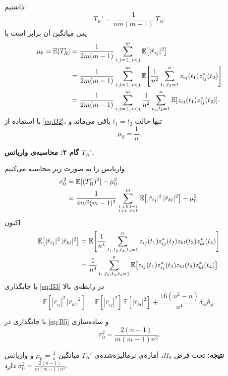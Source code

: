 \begin{اثبات}
	داشتیم‌:
	\[
	T_{R}'=\frac{1}{nm(m-1)}\,T_{R}.
	\]
	پس میانگین آن برابر است با
	\begin{align}
		\mu_{0}=\mathbb{E}[T_{R}']
		&=\frac{1}{2m(m-1)}\sum_{i,j=1,\; i<j}^{m}\mathbb{E}\!\left[|\hat r_{ij}|^{2}\right] \notag \\
		&=\frac{1}{2m(m-1)}\sum_{i,j=1,\; i<j}^{m}
		\mathbb{E}\!\left[\frac{1}{n^{2}}\sum_{t_{1},t_{2}=1}^{n}z_{ij}(t_{1})z_{ij}^{*}(t_{2})\right] \notag \\
		&=\frac{1}{2m(m-1)}\sum_{i,j=1,\; i<j}^{m}\frac{1}{n^{2}}\sum_{t_{1},t_{2}=1}^{n}\mathbb{E}[z_{ij}(t_{1})z_{ij}^{*}(t_{2})]. \label{eq:B4}
	\end{align}
	با استفاده از \eqref{eq:B2}، تنها حالت $t_{1}=t_{2}$ باقی می‌ماند و
	\[
	\mu_{0}=\frac{1}{n}.
	\]
	
	\medskip
	\noindent\textbf{گام ۲: محاسبه‌ی واریانس $T_{R}'$.}
	
	واریانس را به صورت زیر محاسبه می‌کنیم
	\begin{align}
		\sigma_{0}^{2}&=\mathbb{E}[(T_{R}')^{2}]-\mu_{0}^{2} \notag \\
		&=\frac{1}{4m^{2}(m-1)^{2}}
		\sum_{i,j,k,l=1 \atop i<j,\;k<l}^{m}\mathbb{E}\!\left[|\hat r_{ij}|^{2}\,|\hat r_{kl}|^{2}\right]-\mu_{0}^{2}. \label{eq:B5}
	\end{align}
	اکنون
	\begin{align}
		\mathbb{E}\!\left[|\hat r_{ij}|^{2}\,|\hat r_{kl}|^{2}\right]
		&=\mathbb{E}\!\left[\frac{1}{n^{4}}\sum_{t_{1},t_{2},t_{3},t_{4}=1}^{n}
		z_{ij}(t_{1})z_{ij}^{*}(t_{2})z_{kl}(t_{3})z_{kl}^{*}(t_{4})\right] \notag \\
		&=\frac{1}{n^{4}}\sum_{t_{1},t_{2},t_{3},t_{4}=1}^{n}
		\mathbb{E}\!\left[z_{ij}(t_{1})z_{ij}^{*}(t_{2})z_{kl}(t_{3})z_{kl}^{*}(t_{4})\right]. \label{eq:B6}
	\end{align}
	با جایگذاری \eqref{eq:B3} در رابطه‌ی بالا
	\begin{equation}
	\mathbb{E}\!\left[|\hat r_{ij}|^{2}\,|\hat r_{kl}|^{2}\right]
	=\mathbb{E}[|\hat r_{ij}|^{2}]\,\mathbb{E}[|\hat r_{kl}|^{2}]
	+\frac{16(n^{2}-n)}{n^{4}}\delta_{ik}\delta_{jl}.
	\end{equation}
	
	با جایگذاری در \eqref{eq:B5} و ساده‌سازی 
	\begin{equation}
	\sigma_{0}^{2}=\frac{2(n-1)}{m(m-1)n^{3}}.
	\end{equation}
	
	\medskip
	\noindent\textbf{نتیجه:}  
	تحت فرض $H_{0}$، آماره‌ی نرمالیزه‌شده‌ی $T_{R}'$ میانگین
	$
	\mu_{0}=\tfrac{1}{n}
	$
	و واریانس
	$
	\sigma_{0}^{2}=\tfrac{2(n-1)}{m(m-1)n^{3}}
	$
	دارد.
		
\end{اثبات}

